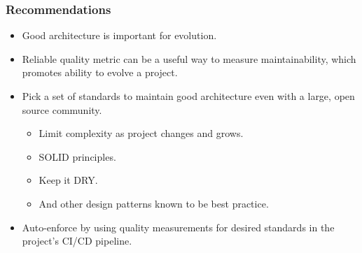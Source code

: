 \documentclass{beamer}
\begin{document}
\begin{frame}
  \frametitle{Recommendations}
  \begin{itemize}
    \item Good architecture is important for evolution.
    
    \vspace{0.35cm}    
    \item Reliable quality metric can be a useful way to measure maintainability, which promotes ability to evolve a project.
    
    \vspace{0.35cm}
    \item Pick a set of standards to maintain good architecture even with a large, open source community.
    \begin{itemize}
      \item Limit complexity as project changes and grows.
      \item SOLID principles.
      \item Keep it DRY.
      \item And other design patterns known to be best practice.
    \end{itemize}
    
    \vspace{0.35cm}
    \item Auto-enforce by using quality measurements for desired standards in the project's CI/CD pipeline.
  \end{itemize}
\end{frame}
\end{document}
